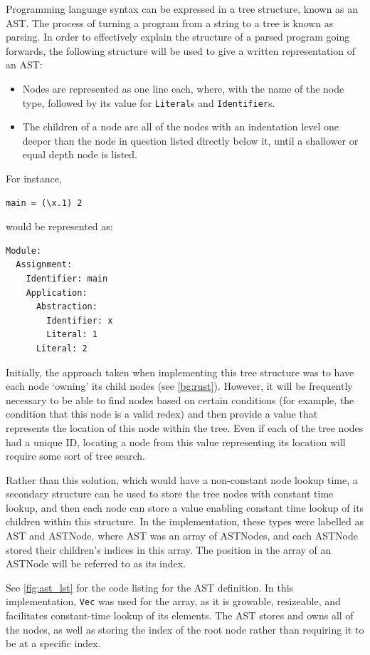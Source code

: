 Programming language syntax can be expressed in a tree structure, known as an \ac{AST}. The process of turning a program from a string to a tree is known as parsing. In order to effectively explain the structure of a parsed program going forwards, the following structure will be used to give a written representation of an \ac{AST}:
\begin{itemize}
    \item Nodes are represented as one line each, where, with the name of the node type, followed by its value for \verb|Literal|s and \verb|Identifier|s.
    \item The children of a node are all of the nodes with an indentation level one deeper than the node in question listed directly below it, until a shallower or equal depth node is listed. 
\end{itemize}

\noindent
For instance, 
\begin{lstlisting}
main = (\x.1) 2
\end{lstlisting}
would be represented as:
\begin{lstlisting}
Module:
  Assignment:
    Identifier: main
    Application:
      Abstraction:
        Identifier: x
        Literal: 1
      Literal: 2
\end{lstlisting}
Initially, the approach taken when implementing this tree structure was to have each node `owning' its child nodes (see \ref{bg:rust}). However, it will be frequently necessary to be able to find nodes based on certain conditions (for example, the condition that this node is a valid redex) and then provide a value that represents the location of this node within the tree. Even if each of the tree nodes had a unique ID, locating a node from this value representing its location will require some sort of tree search.

Rather than this solution, which would have a non-constant node lookup time, a secondary structure can be used to store the tree nodes with constant time lookup, and then each node can store a value enabling constant time lookup of its children within this structure. In the implementation, these types were labelled as \ac{AST} and ASTNode, where \ac{AST} was an array of ASTNodes, and each ASTNode stored their children's indices in this array. The position in the array of an ASTNode will be referred to as its index.

See \ref{fig:ast_lst} for the code listing for the \ac{AST} definition. In this implementation, \verb|Vec| was used for the array, as it is growable, resizeable, and facilitates constant-time lookup of its elements. The \ac{AST} stores and owns all of the nodes, as well as storing the index of the root node rather than requiring it to be at a specific index. 

